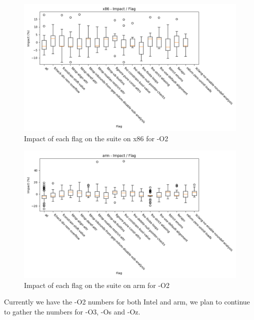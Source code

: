 \begin{figure}[H]
  \centering
  \includegraphics[scale=0.6]{x86_impact_per_flag}
  \caption{Impact of each flag on the suite on x86 for -O2}
  \label{fig:x86_impact_per_flag}
\end{figure}

\begin{figure}[H]
  \centering
  \includegraphics[scale=0.6]{arm_impact_per_flag}
  \caption{Impact of each flag on the suite on arm for -O2}
  \label{fig:arm_impact_per_flag}
\end{figure}

Currently we have the -O2 numbers for both Intel and arm, we plan to continue to
gather the numbers for -O3, -Os and -Oz.
